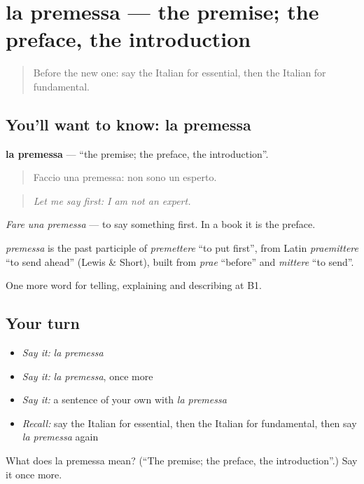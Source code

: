 \section[la premessa]{la premessa — the premise; the preface, the introduction}

\label{lesson:IT-C371-premessa}



\begin{quote}
Before the new one: say the Italian for essential, then the Italian for fundamental.
\end{quote}

\subsection*{You'll want to know: la premessa}
\textbf{la premessa} — \textquotedblleft{}the premise; the preface, the introduction\textquotedblright{}.

\begin{quote}
Faccio una premessa: non sono un esperto.
\end{quote}

\begin{quote}
\emph{Let me say first: I am not an expert.}
\end{quote}

\emph{Fare una premessa} — to say something first. In a book it is the preface.

\begin{cousinweb}
\emph{premessa} is the past participle of \emph{premettere} \textquotedblleft{}to put first\textquotedblright{}, from Latin \emph{praemittere} \textquotedblleft{}to send ahead\textquotedblright{} (Lewis \& Short), built from \emph{prae} \textquotedblleft{}before\textquotedblright{} and \emph{mittere} \textquotedblleft{}to send\textquotedblright{}.
\end{cousinweb}

\begin{grammarlens}[title={What you've built}]
One more word for telling, explaining and describing at B1.
\end{grammarlens}

\subsection*{Your turn}
\begin{itemize}
\raggedright
  \item \emph{Say it:} \emph{la premessa}
  \item \emph{Say it:} \emph{la premessa}, once more
  \item \emph{Say it:} a sentence of your own with \emph{la premessa}
  \item \emph{Recall:} say the Italian for essential, then the Italian for fundamental, then say \emph{la premessa} again
\end{itemize}

\begin{tcolorbox}[breakable,colback=teal!4,colframe=teal!35!black,title={Before you move on}]
What does la premessa mean? (\textquotedblleft{}The premise; the preface, the introduction\textquotedblright{}.) Say it once more.
\end{tcolorbox}
